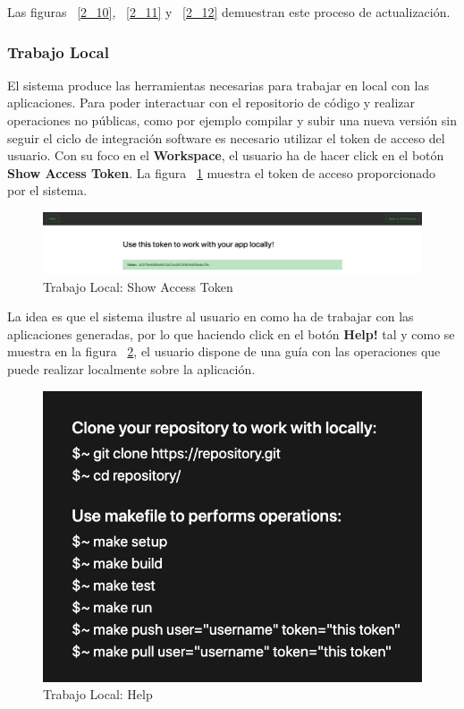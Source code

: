\documentclass[a4paper,11pt]{book}
\begin{document}
Las figuras ~\ref{2_10},  ~\ref{2_11}  y  ~\ref{2_12} demuestran este proceso de actualización. 

\subsubsection{Trabajo Local}

El sistema produce las herramientas necesarias para trabajar en local con las aplicaciones. Para poder interactuar con el repositorio de código y realizar operaciones no públicas, como por ejemplo compilar y subir una nueva versión sin seguir el ciclo de integración software es necesario utilizar el token de acceso del usuario. Con su foco en el \textbf{Workspace}, el usuario ha de hacer click en el botón \textbf{Show Access Token}. La figura  ~\ref{3_1} muestra el token de acceso proporcionado por el sistema. 

   \begin{figure}[H]
\centering
\includegraphics[scale=0.22]{imagenes/casouso_a/3_1.png}
\caption{  Trabajo Local:  Show Access Token}
\label{3_1}
\end{figure}


La idea es que el sistema ilustre al usuario en como ha de trabajar con las aplicaciones generadas, por lo  que haciendo click en el botón \textbf{Help!}  tal y como se muestra en la figura ~\ref{3_4},   el usuario dispone de una guía con las operaciones que puede realizar localmente sobre la aplicación.

   \begin{figure}[H]
\centering
\includegraphics[scale=0.5]{imagenes/casouso_a/3_4.png}
\caption{   Trabajo Local: Help}
\label{3_4}
\end{figure}
\end{document}
